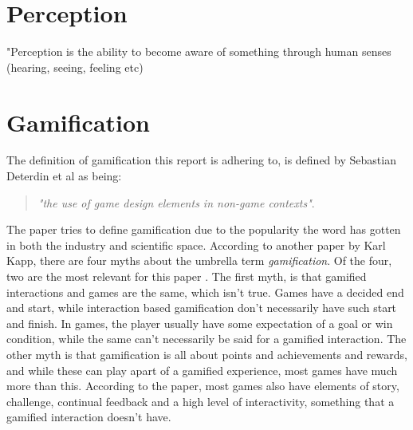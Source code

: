 \section{Perception}
"Perception is the ability to become aware of something through human senses (hearing, seeing, feeling etc)\\







\section{Gamification}
    The definition of gamification this report is adhering to, is defined by Sebastian Deterdin et al as being: \begin{quote}
        \textit{"the use of game design elements in non-game contexts"}\cite{gamification}.
    \end{quote}
    The paper tries to define gamification due to the popularity the word has gotten in both the industry and scientific space\cite{gamification}. According to another paper by Karl Kapp\cite{gamificationMyths}, there are four myths about the umbrella term \textit{gamification}\cite{gamificationMyths}. Of the four, two are the most relevant for this paper . The first myth, is that gamified interactions and games are the same, which isn't true\cite{gamificationMyths}. Games have a decided end and start, while interaction based gamification don't necessarily have such start and finish\cite{gamificationMyths}. In games, the player usually have some expectation of a goal or win condition, while the same can't necessarily be said for a gamified interaction\cite{gamificationMyths}. The other myth is that gamification is all about points and achievements and rewards, and while these can play apart of a gamified experience, most games have much more than this\cite{gamificationMyths}. According to the paper, most games also have elements of story, challenge, continual feedback and a high level of interactivity, something that a gamified interaction doesn't have\cite{gamificationMyths}.\\
    
